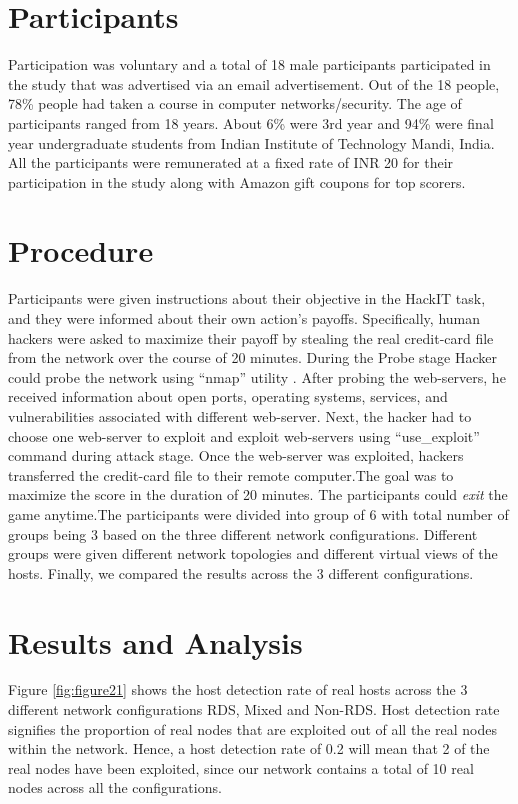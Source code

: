 \section{Participants}
Participation was voluntary and a total of 18 male participants participated in the study that was advertised via an email advertisement. Out of the 18 people, 78\% people had taken a course in computer networks/security. The age of participants ranged from 18 years. About 6\% were 3rd year and 94\% were final year undergraduate students from Indian Institute of Technology Mandi, India. All the participants were remunerated at a fixed rate of INR 20 for their participation in the study along with Amazon gift coupons for top scorers.

\section{Procedure}
Participants were given instructions about their objective in the HackIT task, and they were informed about their own action’s payoffs. Specifically, human hackers were asked to maximize their payoff by stealing the real credit-card file from the network over the course of 20 minutes. During the Probe stage Hacker could probe the network using \enquote{nmap} utility . After probing the web-servers, he received information about open ports, operating systems, services, and vulnerabilities associated with different web-server. Next, the hacker had to choose one web-server to exploit and exploit web-servers using “use\_exploit” command during attack stage. Once the web-server was exploited, hackers transferred the credit-card file to their remote computer.The goal was to maximize the score in the duration of 20 minutes. The participants could \textit{exit} the game anytime.The participants were divided into group of 6 with total number of groups being 3 based on the three different network configurations. Different groups were given different network topologies and different virtual views of the hosts. Finally, we compared the results across the 3 different configurations.

\section{Results and Analysis}
Figure \ref{fig:figure21} shows the host detection rate of real hosts across the 3 different network configurations RDS, Mixed and Non-RDS. Host detection rate signifies the proportion of real nodes that are exploited out of all the real nodes within the network. Hence, a host detection rate of 0.2 will mean that 2 of the real nodes have been exploited, since our network contains a total of 10 real nodes across all the configurations.


